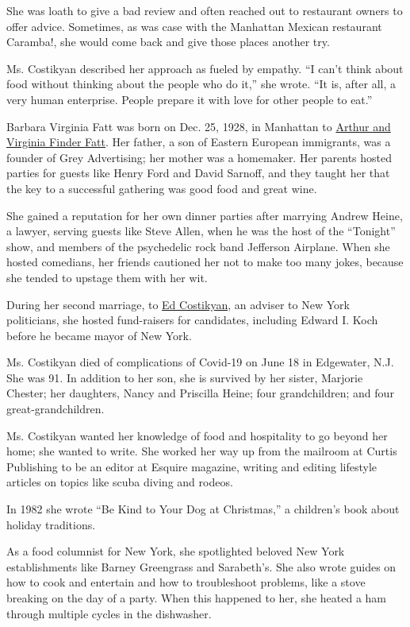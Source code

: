 She was loath to give a bad review and often reached out to restaurant
owners to offer advice. Sometimes, as was case with the Manhattan
Mexican restaurant Caramba!, she would come back and give those places
another try.

Ms. Costikyan described her approach as fueled by empathy. ``I can't
think about food without thinking about the people who do it,'' she
wrote. ``It is, after all, a very human enterprise. People prepare it
with love for other people to eat.''

Barbara Virginia Fatt was born on Dec. 25, 1928, in Manhattan to
\href{https://www.nytimes3xbfgragh.onion/1999/01/16/business/arthur-fatt-94-advertising-co-founder.html}{Arthur
and Virginia Finder Fatt}. Her father, a son of Eastern European
immigrants, was a founder of Grey Advertising; her mother was a
homemaker. Her parents hosted parties for guests like Henry Ford and
David Sarnoff, and they taught her that the key to a successful
gathering was good food and great wine.

She gained a reputation for her own dinner parties after marrying Andrew
Heine, a lawyer, serving guests like Steve Allen, when he was the host
of the ``Tonight'' show, and members of the psychedelic rock band
Jefferson Airplane. When she hosted comedians, her friends cautioned her
not to make too many jokes, because she tended to upstage them with her
wit.

During her second marriage, to
\href{https://www.nytimes3xbfgragh.onion/2012/06/23/nyregion/edward-n-costikyan-adviser-to-new-york-politicians-is-dead-at-87.html}{Ed
Costikyan}, an adviser to New York politicians, she hosted fund-raisers
for candidates, including Edward I. Koch before he became mayor of New
York.

Ms. Costikyan died of complications of Covid-19 on June 18 in Edgewater,
N.J. She was 91. In addition to her son, she is survived by her sister,
Marjorie Chester; her daughters, Nancy and Priscilla Heine; four
grandchildren; and four great-grandchildren.

Ms. Costikyan wanted her knowledge of food and hospitality to go beyond
her home; she wanted to write. She worked her way up from the mailroom
at Curtis Publishing to be an editor at Esquire magazine, writing and
editing lifestyle articles on topics like scuba diving and rodeos.

In 1982 she wrote ``Be Kind to Your Dog at Christmas,'' a children's
book about holiday traditions.

As a food columnist for New York, she spotlighted beloved New York
establishments like Barney Greengrass and Sarabeth's. She also wrote
guides on how to cook and entertain and how to troubleshoot problems,
like a stove breaking on the day of a party. When this happened to her,
she heated a ham through multiple cycles in the dishwasher.

